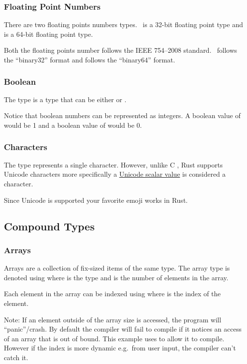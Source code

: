 \documentclass{beamer}
\begin{document}
\begin{frame}
  \frametitle{Floating Point Numbers}
  There are two floating points numbers types.\  is a 32-bit floating point type and  is a 64-bit floating point type.

  Both the floating points number follows the IEEE 754--2008 standard.\  follows the ``binary32'' format and  follows the ``binary64'' format.
  
\end{frame}

\begin{frame}
  \frametitle{Boolean}
  The  type is a type that can be either  or .
  
  \alert{Notice} that boolean numbers can be represented as integers. A boolean value of  would be 1 and a boolean value of  would be 0.
\end{frame}

\begin{frame}
  \frametitle{Characters}
  The  type represents a single character. However, unlike C , Rust  supports Unicode characters more specifically a \href{https://www.unicode.org/glossary/\#unicode_scalar_value}{Unicode scalar value} is considered a character.

  Since Unicode is supported your favorite emoji works in Rust.
\end{frame}

\subsection{Compound Types}
\begin{frame}[allowframebreaks]
  \frametitle{Arrays}
  Arrays are a collection of fix-sized items of the same type. The array type is denoted using \inlinecode{[T;\@ N]} where  is the type and  is the number of elements in the array.
  

  Each element in the array can be indexed using \inlinecode{[i]} where  is the index of the element.
  

  \alert{Note:} If an element outside of the array size is accessed, the program will ``panic''/crash. By default the compiler will fail to compile if it notices an access of an array that is out of bound. This example uses  to allow it to compile. However if the index is more dynamic e.g.\ from user input, the compiler can't catch it.
  
\end{frame}
\end{document}
